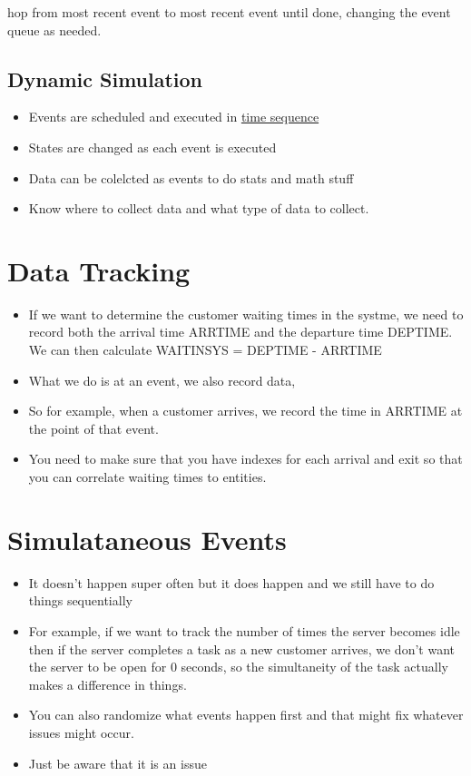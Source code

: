 \documentclass[fleqn]{report}
\begin{document}
hop from most recent event to most recent event until done, 
changing the event queue as needed. 

\subsection{Dynamic Simulation}
\begin{itemize}
    \item
Events are scheduled and executed in \underline{time sequence}
    \item
States are changed as each event is executed 
    \item
Data can be colelcted as events to do stats and math stuff 
    \item
Know where to collect data and what type of data to collect. 
\end{itemize}


\section{Data Tracking}
\begin{itemize}
    \item
If we want to determine the customer waiting times in the systme, 
we need to record both the arrival time ARRTIME and the departure 
time DEPTIME. We can then calculate WAITINSYS = DEPTIME - ARRTIME
    \item
What we do is at an event, we also record data, 
    \item
So for example, when a customer arrives, we record the time in ARRTIME 
at the point of that event. 
    \item
You need to make sure that you have indexes for each arrival 
and exit so that you can correlate waiting times to entities. 
\end{itemize}

\section{Simulataneous Events}
\begin{itemize}
    \item
It doesn't happen super often but it does happen and we still have 
to do things sequentially 
    \item
For example, if we want to track the number of times the server becomes idle 
then if the server completes a task as a new customer arrives, we don't want 
the server to be open for $0$ seconds, so the simultaneity of the task 
actually makes a difference in things. 
    \item 
You can also randomize what events happen first and that might fix 
whatever issues might occur. 
    \item
Just be aware that it is an issue 
\end{itemize}
\end{document}
